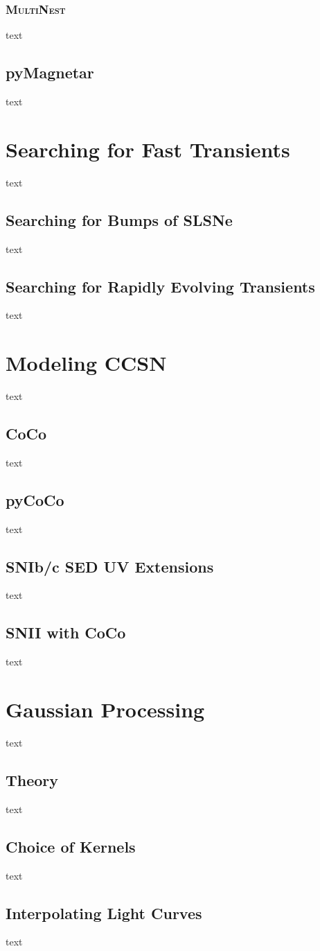 \subsubsection{\textsc{MultiNest}}
text
\subsection{pyMagnetar}
text

\section{Searching for Fast Transients}
text
\subsection{Searching for Bumps of SLSNe}
text
\subsection{Searching for Rapidly Evolving Transients}
text

\section{Modeling CCSN}
text
\subsection{CoCo}
text
\subsection{pyCoCo}
text
\subsection{SNIb/c SED UV Extensions}
text
\subsection{SNII with CoCo}
text

\section{Gaussian Processing}
text
\subsection{Theory}
text
\subsection{Choice of Kernels}
text
\subsection{Interpolating Light Curves}
text
